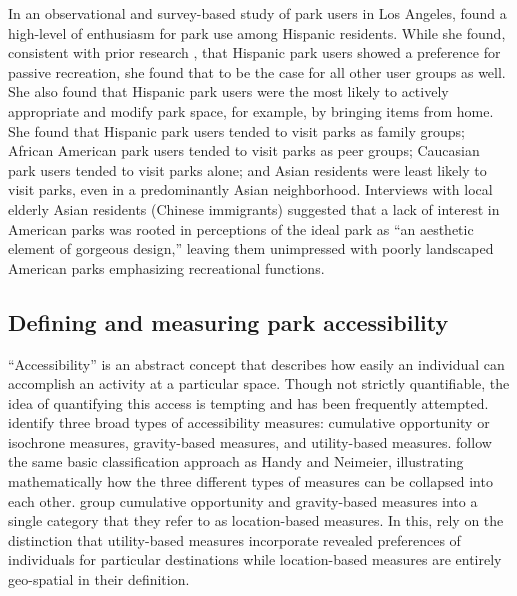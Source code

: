 \documentclass[3p, authoryear, review]{elsarticle} %
\begin{document}
In an observational and survey-based study of park users in Los Angeles,
\citet{loukaitou1995urban} found a high-level of enthusiasm for park use among Hispanic residents. While she found, consistent with prior research \citep{baas1993influence, hutchison1987ethnicity, irwin1990mexican}, that Hispanic park users showed a preference for passive recreation, she found that to be the case for all other user groups as well. She also found that Hispanic park users were the most likely to actively appropriate and modify park space, for example, by bringing items from home. She found that Hispanic park users tended to visit parks as family groups; African American park users tended to visit parks as peer groups; Caucasian park users tended to visit parks alone; and Asian residents were least likely to visit parks, even in a predominantly Asian neighborhood. Interviews with local elderly Asian residents (Chinese immigrants) suggested that a lack of interest in American parks was rooted in perceptions of the ideal park as ``an aesthetic element of gorgeous design,'' leaving them unimpressed with poorly landscaped American parks emphasizing recreational functions.

\hypertarget{defining-and-measuring-park-accessibility}{%
\subsection{Defining and measuring park accessibility}\label{defining-and-measuring-park-accessibility}}

``Accessibility'' is an abstract concept that describes how easily an individual can accomplish an activity at a particular space. Though not strictly quantifiable, the idea of quantifying this access is tempting and has been frequently attempted. \citet{Handy1997} identify three broad types of accessibility measures: cumulative opportunity or isochrone measures, gravity-based measures, and utility-based measures. \citet{Dong2006} follow the same basic classification approach as Handy and Neimeier, illustrating mathematically how the three different types of measures can be collapsed into each other. \citet{GEURS2004127} group cumulative opportunity and gravity-based measures into a single category that they refer to as location-based measures. In this, \citet{GEURS2004127} rely on the distinction that utility-based measures incorporate revealed preferences of individuals for particular destinations while location-based measures are entirely geo-spatial in their definition.
\end{document}
